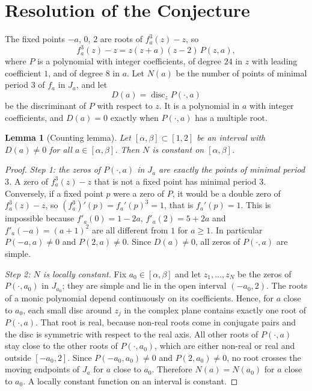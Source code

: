 \documentclass[12pt,a4paper]{report}
\newtheorem{lema}{Lemma}[section]
\theoremstyle{definition}
\begin{document}
\section{Resolution of the Conjecture}

The fixed points $-a$, $0$, $2$ are roots of $f_a^3(z) - z$, so
\[
f_a^3(z) - z = z(z+a)(z-2)\,P(z,a),
\]
where $P$ is a polynomial with integer coefficients, of degree $24$ in $z$ with leading coefficient $1$, and of degree $8$ in $a$. Let $N(a)$ be the number of points of minimal period $3$ of $f_a$ in $J_a$, and let
\[
D(a) = \operatorname{disc}_z P(\cdot,a)
\]
be the discriminant of $P$ with respect to $z$. It is a polynomial in $a$ with integer coefficients, and $D(a)=0$ exactly when $P(\cdot,a)$ has a multiple root.

\begin{lema}[Counting lemma]\label{lem:count}
Let $[\alpha,\beta]\subset[1,2]$ be an interval with $D(a)\ne0$ for all $a\in[\alpha,\beta]$. Then $N$ is constant on $[\alpha,\beta]$.
\end{lema}

\begin{proof}
\emph{Step 1: the zeros of $P(\cdot, a)$ in $J_a$ are exactly the points of minimal period $3$.} A zero of $f_a^3(z) - z$ that is not a fixed point has minimal period $3$. Conversely, if a fixed point $p$ were a zero of $P$, it would be a double zero of $f^3_a(z)-z$, so $(f_a^3)'(p) = f_a'(p)^3 = 1$, that is $f_a'(p) = 1$. This is impossible because $f'_a(0) = 1-2a$, $f'_a(2) = 5+2a$ and $f'_a(-a) = (a+1)^2$ are all different from $1$ for $a\ge1$. In particular $P(-a,a)\ne0$ and $P(2,a)\ne0$. Since $D(a)\neq 0$, all zeros of $P(\cdot,a)$ are simple.

\emph{Step 2: $N$ is locally constant.} Fix $a_0\in[\alpha,\beta]$ and let $z_1,\dots,z_N$ be the zeros of $P(\cdot,a_0)$ in $J_{a_0}$; they are simple and lie in the open interval $(-a_0,2)$. The roots of a monic polynomial depend continuously on its coefficients. Hence, for $a$ close to $a_0$, each small disc around $z_j$ in the complex plane contains exactly one root of $P(\cdot,a)$. That root is real, because non-real roots come in conjugate pairs and the disc is symmetric with respect to the real axis. All other roots of $P(\cdot,a)$ stay close to the other roots of $P(\cdot,a_0)$, which are either non-real or real and outside $[-a_0,2]$. Since $P(-a_0,a_0)\neq 0$ and $P(2,a_0)\ne 0$, no root crosses the moving endpoints of $J_a$ for $a$ close to $a_0$. Therefore $N(a) = N(a_0)$ for $a$ close to $a_0$. A locally constant function on an interval is constant.
\end{proof}
\end{document}
